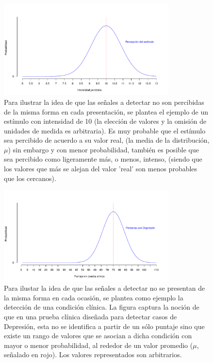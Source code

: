 \begin{figure}[th]
\centering
\includegraphics[width=0.80\textwidth]{Figures/Signal_Perception} 
\caption[Variabilidad en la percepción de los estímulos]{Para ilustrar la idea de que las señales a detectar no son percibidas de la misma forma en cada presentación, se plantea el ejemplo de un estímulo con intensidad de 10 (la elección de valores y la omisión de unidades de medida es arbitraria). Es muy probable que el estímulo sea percibido de acuerdo a su valor real, (la media de la distribución, $\mu$) sin embargo y con menor probabilidad, también es posible que sea percibido como ligeramente más, o menos, intenso, (siendo que los valores que más se alejan del valor 'real' son menos probables que los cercanos).}
\label{fig:Senal_percepcion}
\end{figure}

\begin{figure}[th]
\centering
\includegraphics[width=0.80\textwidth]{Figures/Signal_Presentation} 
\caption[Variabilidad en la presentación de los estímulos]{Para ilustar la idea de que las señales a detectar no se presentan de la misma forma en cada ocasión, se plantea como ejemplo la detección de una condición clínica. La figura captura la noción de que en una prueba clínica diseñada para detectar casos de Depresión, esta no se identifica a partir de un sólo puntaje sino que existe un rango de valores que se asocian a dicha condición con mayor o menor probabilidad, al rededor de un valor promedio ($\mu$, señalado en rojo). Los valores representados son arbitrarios.}
\label{fig:Senal_presentacion}
\end{figure}

